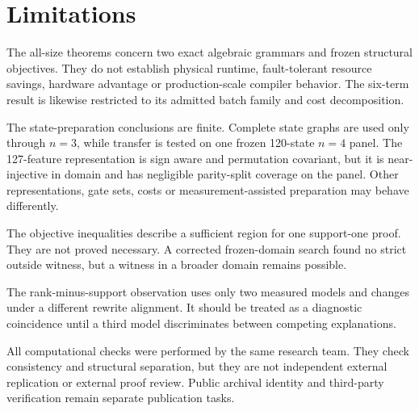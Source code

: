 \section{Limitations}

The all-size theorems concern two exact algebraic grammars and frozen structural objectives.  They do not establish physical runtime, fault-tolerant resource savings, hardware advantage or production-scale compiler behavior.  The six-term result is likewise restricted to its admitted batch family and cost decomposition.

The state-preparation conclusions are finite.  Complete state graphs are used only through $n=3$, while transfer is tested on one frozen 120-state $n=4$ panel.  The 127-feature representation is sign aware and permutation covariant, but it is near-injective in domain and has negligible parity-split coverage on the panel.  Other representations, gate sets, costs or measurement-assisted preparation may behave differently.

The objective inequalities describe a sufficient region for one support-one proof.  They are not proved necessary.  A corrected frozen-domain search found no strict outside witness, but a witness in a broader domain remains possible.

The rank-minus-support observation uses only two measured models and changes under a different rewrite alignment.  It should be treated as a diagnostic coincidence until a third model discriminates between competing explanations.

All computational checks were performed by the same research team.  They check consistency and structural separation, but they are not independent external replication or external proof review.  Public archival identity and third-party verification remain separate publication tasks.
